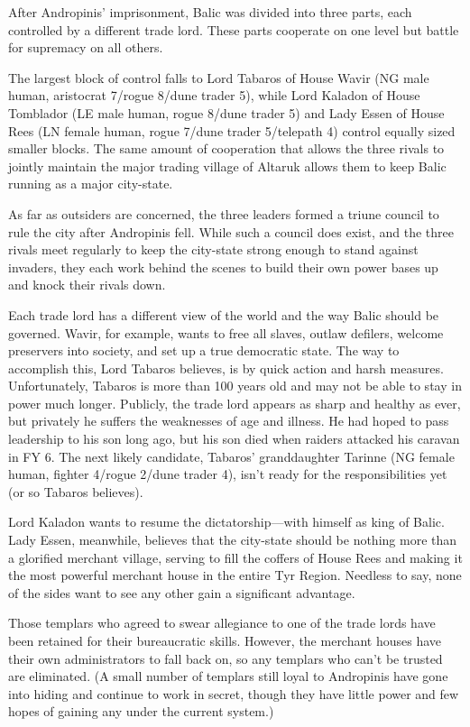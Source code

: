 {

	After Andropinis' imprisonment, Balic was divided into three parts, each controlled by a different trade lord. These parts cooperate on one level but battle for supremacy on all others.

	The largest block of control falls to Lord Tabaros of House Wavir (NG male human, aristocrat 7/rogue 8/dune trader 5), while Lord Kaladon of House Tomblador (LE male human, rogue 8/dune trader 5) and Lady Essen of House Rees (LN female human, rogue 7/dune trader 5/telepath 4) control equally sized smaller blocks. The same amount of cooperation that allows the three rivals to jointly maintain the major trading village of Altaruk allows them to keep Balic running as a major city-state.

	As far as outsiders are concerned, the three leaders formed a triune council to rule the city after Andropinis fell. While such a council does exist, and the three rivals meet regularly to keep the city-state strong enough to stand against invaders, they each work behind the scenes to build their own power bases up and knock their rivals down.

	Each trade lord has a different view of the world and the way Balic should be governed. Wavir, for example, wants to free all slaves, outlaw defilers, welcome preservers into society, and set up a true democratic state. The way to accomplish this, Lord Tabaros believes, is by quick action and harsh measures. Unfortunately, Tabaros is more than 100 years old and may not be able to stay in power much longer. Publicly, the trade lord appears as sharp and healthy as ever, but privately he suffers the weaknesses of age and illness. He had hoped to pass leadership to his son long ago, but his son died when raiders attacked his caravan in FY 6. The next likely candidate, Tabaros' granddaughter Tarinne (NG female human, fighter 4/rogue 2/dune trader 4), isn't ready for the responsibilities yet (or so Tabaros believes).

	Lord Kaladon wants to resume the dictatorship---with himself as king of Balic. Lady Essen, meanwhile, believes that the city-state should be nothing more than a glorified merchant village, serving to fill the coffers of House Rees and making it the most powerful merchant house in the entire Tyr Region. Needless to say, none of the sides want to see any other gain a significant advantage.

	Those templars who agreed to swear allegiance to one of the trade lords have been retained for their bureaucratic skills. However, the merchant houses have their own administrators to fall back on, so any templars who can't be trusted are eliminated. (A small number of templars still loyal to Andropinis have gone into hiding and continue to work in secret, though they have little power and few hopes of gaining any under the current system.)

}
